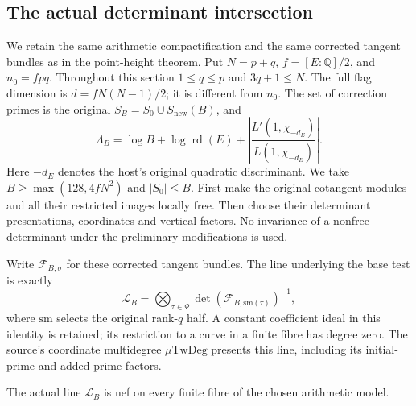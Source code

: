 \subsection{The actual determinant intersection}
\label{sec:geometry-height-assembly}

We retain the same arithmetic compactification and the same corrected
tangent bundles as in the point-height theorem.  Put $N=p+q$,
$f=[E:\mathbb Q]/2$, and $n_0=fpq$.  Throughout this section
$1\le q\le p$ and $3q+1\le N$.  The full flag dimension is
$d=fN(N-1)/2$; it is different from $n_0$.
The set of correction primes is the original
$S_B=S_0\cup S_{\mathrm{new}}(B)$, and
\[
 \Lambda_B=\log B+\log\operatorname{rd}(E)
              +\left|\frac{L'(1,\chi_{-d_E})}{L(1,\chi_{-d_E})}\right|.
\]
Here $-d_E$ denotes the host's original quadratic discriminant.
We take $B\ge\max(128,4fN^2)$ and $|S_0|\le B$.
First make the original cotangent modules and all their restricted
images locally free.  Then choose their determinant presentations,
coordinates and vertical factors.  No invariance of a nonfree
determinant under the preliminary modifications is used.

Write $\mathcal F_{B,\sigma}$ for these corrected tangent bundles.
The line underlying the base test is exactly
\[
       \mathcal L_B=
       \bigotimes_{\tau\in\Psi}
                    \det(\mathcal F_{B,\mathrm{sm}(\tau)})^{-1},
 \tag{HA1}
\]
where $\mathrm{sm}$ selects the original rank-$q$ half.  A constant
coefficient ideal in this identity is retained; its restriction to a
curve in a finite fibre has degree zero.  The source's coordinate
multidegree $\mu\mathrm{TwDeg}$ presents this line, including its
initial-prime and added-prime factors\cite{height-assembly-source}.

\begin{proposition}
\label{prop:actual-finite-fibre-nefness}
The actual line $\mathcal L_B$ is nef on every finite fibre of the
chosen arithmetic model.
\end{proposition}

